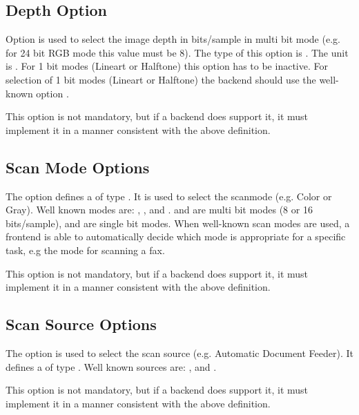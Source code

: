 \documentclass[11pt,DVIps]{report}
\begin{document}
\begin{changebar}
\subsection{Depth Option}
Option  is used to select the image depth in bits/sample
in multi bit mode (e.g. for 24 bit RGB mode this value must be 8).
The type of this option is .
The unit is . For 1 bit modes
(Lineart or Halftone) this option has to be inactive.
For selection of 1 bit modes (Lineart or Halftone) the
backend should use the well-known option .
 
This option is not mandatory, but if a backend does support it, it
must implement it in a manner consistent with the above definition.
\end{changebar}
 
\begin{changebar}
\subsection{Scan Mode Options}
The option  defines a 
of type .
It is used to select the scanmode (e.g. Color or Gray).
Well known modes are: , , 
and .  and  are multi bit
modes (8 or 16 bits/sample),  and 
are single bit modes. When well-known scan modes are used,
a frontend is able to automatically decide which mode is appropriate
for a specific task, e.g the mode 
for scanning a fax.
 
This option is not mandatory, but if a backend does support it, it
must implement it in a manner consistent with the above definition.
\end{changebar}
 
\begin{changebar}
\subsection{Scan Source Options}
The option  is used to select the scan source
(e.g. Automatic Document Feeder).
It defines a 
of type .
Well known sources are: ,  and
.
 
This option is not mandatory, but if a backend does support it, it
must implement it in a manner consistent with the above definition.
\end{changebar}
\end{document}
